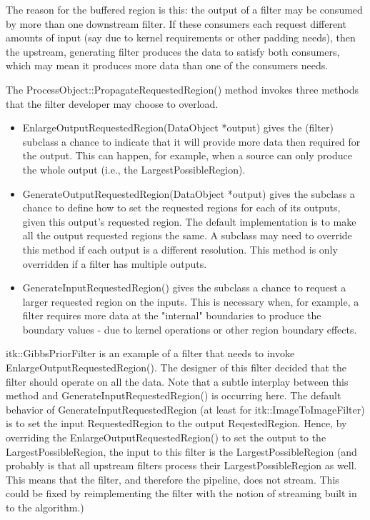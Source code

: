 The reason for the buffered region is this: the output of a filter may be
consumed by more than one downstream filter. If these consumers each request
different amounts of input (say due to kernel requirements or other padding
needs), then the upstream, generating filter produces the data to satisfy
both consumers, which may mean it produces more data than one of the
consumers needs.

The ProcessObject::PropagateRequestedRegion() method invokes three methods
that the filter developer may choose to overload. 

\begin{itemize}
        \item EnlargeOutputRequestedRegion(DataObject *output) gives the
        (filter) subclass a chance to indicate that it will provide more data
        then required for the output. This can happen, for example, when a
        source can only produce the whole output (i.e., the
        LargestPossibleRegion).

        \item GenerateOutputRequestedRegion(DataObject *output) gives the
        subclass a chance to define how to set the requested regions for each
        of its outputs, given this output's requested region.  The default
        implementation is to make all the output requested regions the same.
        A subclass may need to override this method if each output is a
        different resolution. This method is only overridden if a filter has
        multiple outputs.

        \item GenerateInputRequestedRegion() gives the subclass a chance to
        request a larger requested region on the inputs. This is necessary
        when, for example, a filter requires more data at the "internal"
        boundaries to produce the boundary values - due to kernel operations
        or other region boundary effects.
\end{itemize}

itk::GibbsPriorFilter is an example of a filter that needs to invoke
EnlargeOutputRequestedRegion(). The designer of this filter decided that the
filter should operate on all the data. Note that a subtle interplay between
this method and GenerateInputRequestedRegion() is occurring here. The default
behavior of GenerateInputRequestedRegion (at least for
itk::ImageToImageFilter) is to set the input RequestedRegion to the output
ReqestedRegion. Hence, by overriding the EnlargeOutputRequestedRegion() to
set the output to the LargestPossibleRegion, the input to this filter is the
LargestPossibleRegion (and probably is that all upstream filters process
their LargestPossibleRegion as well. This means that the filter, and
therefore the pipeline, does not stream. This could be fixed by
reimplementing the filter with the notion of streaming built in to the
algorithm.)

